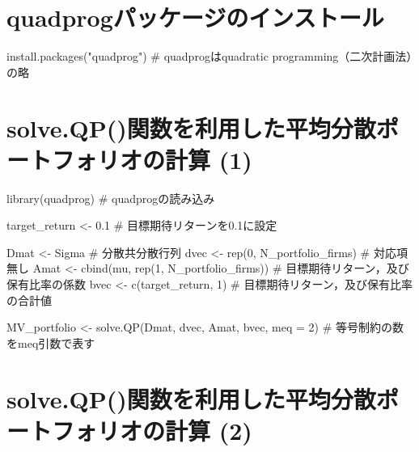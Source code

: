 \documentclass[
  letterpaper,
  DIV=11,
  numbers=noendperiod]{scrreprt}
\newenvironment{Shaded}{\begin{snugshade}}{\end{snugshade}}
\newcommand{\AttributeTok}[1]{\textcolor[rgb]{0.40,0.45,0.13}{#1}}
\newcommand{\CommentTok}[1]{\textcolor[rgb]{0.37,0.37,0.37}{#1}}
\newcommand{\DecValTok}[1]{\textcolor[rgb]{0.68,0.00,0.00}{#1}}
\newcommand{\FloatTok}[1]{\textcolor[rgb]{0.68,0.00,0.00}{#1}}
\newcommand{\FunctionTok}[1]{\textcolor[rgb]{0.28,0.35,0.67}{#1}}
\newcommand{\NormalTok}[1]{\textcolor[rgb]{0.00,0.23,0.31}{#1}}
\newcommand{\OtherTok}[1]{\textcolor[rgb]{0.00,0.23,0.31}{#1}}
\newcommand{\StringTok}[1]{\textcolor[rgb]{0.13,0.47,0.30}{#1}}
\begin{document}
\section{quadprogパッケージのインストール}\label{quadprogux30d1ux30c3ux30b1ux30fcux30b8ux306eux30a4ux30f3ux30b9ux30c8ux30fcux30eb}

\begin{Shaded}
\begin{Highlighting}[]
\FunctionTok{install.packages}\NormalTok{(}\StringTok{"quadprog"}\NormalTok{) }\CommentTok{\# quadprogはquadratic programming（二次計画法）の略}
\end{Highlighting}
\end{Shaded}

\section{solve.QP()関数を利用した平均分散ポートフォリオの計算
(1)}\label{solve.qpux95a2ux6570ux3092ux5229ux7528ux3057ux305fux5e73ux5747ux5206ux6563ux30ddux30fcux30c8ux30d5ux30a9ux30eaux30aaux306eux8a08ux7b97-1}

\begin{Shaded}
\begin{Highlighting}[]
\FunctionTok{library}\NormalTok{(quadprog) }\CommentTok{\# quadprogの読み込み}

\NormalTok{target\_return }\OtherTok{\textless{}{-}} \FloatTok{0.1} \CommentTok{\# 目標期待リターンを0.1に設定}

\NormalTok{Dmat }\OtherTok{\textless{}{-}}\NormalTok{ Sigma }\CommentTok{\# 分散共分散行列}
\NormalTok{dvec }\OtherTok{\textless{}{-}} \FunctionTok{rep}\NormalTok{(}\DecValTok{0}\NormalTok{, N\_portfolio\_firms) }\CommentTok{\# 対応項無し}
\NormalTok{Amat }\OtherTok{\textless{}{-}} \FunctionTok{cbind}\NormalTok{(mu, }\FunctionTok{rep}\NormalTok{(}\DecValTok{1}\NormalTok{, N\_portfolio\_firms)) }\CommentTok{\# 目標期待リターン，及び保有比率の係数}
\NormalTok{bvec }\OtherTok{\textless{}{-}} \FunctionTok{c}\NormalTok{(target\_return, }\DecValTok{1}\NormalTok{) }\CommentTok{\# 目標期待リターン，及び保有比率の合計値}

\NormalTok{MV\_portfolio }\OtherTok{\textless{}{-}} \FunctionTok{solve.QP}\NormalTok{(Dmat, dvec, Amat, bvec, }\AttributeTok{meq =} \DecValTok{2}\NormalTok{) }\CommentTok{\# 等号制約の数をmeq引数で表す}
\end{Highlighting}
\end{Shaded}

\section{solve.QP()関数を利用した平均分散ポートフォリオの計算
(2)}\label{solve.qpux95a2ux6570ux3092ux5229ux7528ux3057ux305fux5e73ux5747ux5206ux6563ux30ddux30fcux30c8ux30d5ux30a9ux30eaux30aaux306eux8a08ux7b97-2}
\end{document}
